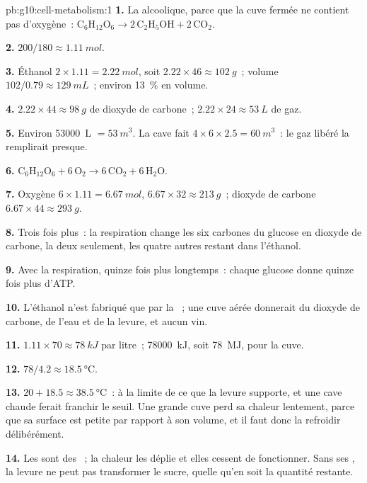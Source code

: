 \begin{solution}{pb:g10:cell-metabolism:1}
\textbf{1.} La  alcoolique, parce que la cuve fermée ne
contient pas d'oxygène~: $\mathrm{C_6H_{12}O_6} \to 2\,\mathrm{C_2H_5OH} +
2\,\mathrm{CO_2}$.

\textbf{2.} $200/180 \approx \qty{1.11}{mol}$.

\textbf{3.} Éthanol $2 \times 1.11 = \qty{2.22}{mol}$, soit $2.22
\times 46 \approx \qty{102}{g}$~; volume $102/0.79 \approx
\qty{129}{mL}$~; environ 13~\% en volume.

\textbf{4.} $2.22 \times 44 \approx \qty{98}{g}$ de dioxyde de
carbone~; $2.22 \times 24 \approx \qty{53}{L}$ de gaz.

\textbf{5.} Environ \qty{53000}{L} $= \qty{53}{m^3}$. La cave fait
$4 \times 6 \times 2.5 = \qty{60}{m^3}$~: le gaz libéré la remplirait
presque.

\textbf{6.} $\mathrm{C_6H_{12}O_6} + 6\,\mathrm{O_2} \to
6\,\mathrm{CO_2} + 6\,\mathrm{H_2O}$.

\textbf{7.} Oxygène $6 \times 1.11 = \qty{6.67}{mol}$, $6.67 \times 32
\approx \qty{213}{g}$~; dioxyde de carbone $6.67 \times 44 \approx
\qty{293}{g}$.

\textbf{8.} Trois fois plus~: la respiration change les six carbones du
glucose en dioxyde de carbone, la  deux seulement, les
quatre autres restant dans l'éthanol.

\textbf{9.} Avec la respiration, quinze fois plus longtemps~: chaque
glucose donne quinze fois plus d'ATP.

\textbf{10.} L'éthanol n'est fabriqué que par la ~; une
cuve aérée donnerait du dioxyde de carbone, de l'eau et de la levure,
et aucun vin.

\textbf{11.} $1.11 \times 70 \approx \qty{78}{kJ}$ par litre~;
\qty{78000}{kJ}, soit \qty{78}{MJ}, pour la cuve.

\textbf{12.} $78/4.2 \approx \qty{18.5}{\celsius}$.

\textbf{13.} $20 + 18.5 \approx \qty{38.5}{\celsius}$~: à la limite de
ce que la levure supporte, et une cave chaude ferait franchir le seuil.
Une grande cuve perd sa chaleur lentement, parce que sa surface est
petite par rapport à son volume, et il faut donc la refroidir
délibérément.

\textbf{14.} Les  sont des ~; la chaleur les déplie et
elles cessent de fonctionner. Sans ses , la levure ne peut pas
transformer le sucre, quelle qu'en soit la quantité restante.


\end{solution}
